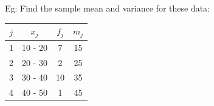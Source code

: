\documentclass[12pt]{article}
\begin{document}
Eg: Find the sample mean and variance for these data:
\begin{table}[H]
    \centering
    \begin{tabular}{|c|c|c|c|}
        \hline $j$ & $x_j$   & $f_j$ & $m_j$ \\
        \hline 1   & 10 - 20 & 7     & 15    \\
        \hline 2   & 20 - 30 & 2     & 25    \\
        \hline 3   & 30 - 40 & 10    & 35    \\
        \hline 4   & 40 - 50 & 1     & 45    \\
        \hline
    \end{tabular}
\end{table}

\end{document}
